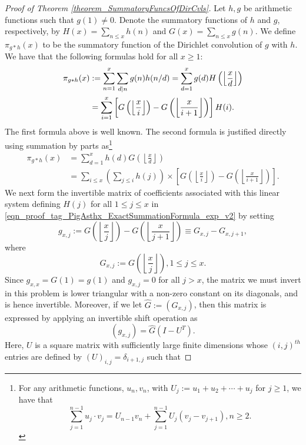 \documentclass[11pt,reqno,a4letter]{article}
\numberwithin{figure}{section}
\numberwithin{table}{section}
\newcommand{\floor}[1]{\left\lfloor #1 \right\rfloor}
\newcommand{\Floor}[2]{\ensuremath{\left\lfloor \frac{#1}{#2} \right\rfloor}}
\theoremstyle{plain}
\numberwithin{theorem}{section}
\theoremstyle{definition}
\begin{document}
\begin{proof}[Proof of Theorem \ref{theorem_SummatoryFuncsOfDirCvls}] 
\label{proofOf_theorem_SummatoryFuncsOfDirCvls} 
Let $h,g$ be arithmetic functions such that $g(1) \neq 0$. 
Denote the summatory functions of $h$ and $g$, 
respectively, by $H(x) = \sum_{n \leq x} h(n)$ and $G(x) = \sum_{n \leq x} g(n)$. 
We define $\pi_{g \ast h}(x)$ to be the summatory function of the 
Dirichlet convolution of $g$ with $h$. 
We have that the following formulas hold for all $x \geq 1$: 
\begin{align} 
\notag 
\pi_{g \ast h}(x) & := \sum_{n=1}^{x} \sum_{d|n} g(n) h(n/d) = \sum_{d=1}^x g(d) H\left(\floor{\frac{x}{d}}\right) \\ 
\label{eqn_proof_tag_PigAsthx_ExactSummationFormula_exp_v2} 
     & = \sum_{i=1}^x \left[G\left(\floor{\frac{x}{i}}\right) - G\left(\floor{\frac{x}{i+1}}\right)\right] H(i). 
\end{align} 
The first formula above is well known. The second formula is justified directly using 
summation by parts as\footnote{
     For any arithmetic functions, $u_n,v_n$, 
     with $U_j := u_1+u_2+\cdots+u_j$ for $j \geq 1$, we have that 
     \cite[\S 2.10(ii)]{NISTHB} 
     \[
     \sum_{j=1}^{n-1} u_j \cdot v_j = U_{n-1} v_n + 
          \sum_{j=1}^{n-1} U_j \left(v_j - v_{j+1}\right), n \geq 2. 
     \]
} 
\begin{align*} 
\pi_{g \ast h}(x) & = \sum_{d=1}^x h(d) G\left(\floor{\frac{x}{d}}\right) \\ 
     & = \sum_{i \leq x} \left(\sum_{j \leq i} h(j)\right) \times 
     \left[G\left(\floor{\frac{x}{i}}\right) - 
     G\left(\floor{\frac{x}{i+1}}\right)\right]. 
\end{align*} 
We next form the invertible matrix of coefficients associated with this linear system defining $H(j)$ for all 
$1 \leq j \leq x$ in \eqref{eqn_proof_tag_PigAsthx_ExactSummationFormula_exp_v2} by setting 
\[
g_{x,j} := G\left(\floor{\frac{x}{j}}\right) - G\left(\floor{\frac{x}{j+1}}\right) \equiv G_{x,j} - G_{x,j+1}, 
\] 
where 
\[
G_{x,j} := G\left(\Floor{x}{j}\right), 1 \leq j \leq x. 
\]
Since $g_{x,x} = G(1) = g(1)$ and $g_{x,j} = 0$ for all $j > x$, 
the matrix we must invert in this problem is lower triangular with a non-zero 
constant on its diagonals, and is hence invertible. 
Moreover, if we let $\hat{G} := (G_{x,j})$, then this matrix is 
expressed by applying an invertible shift operation as 
\[
(g_{x,j}) = \hat{G} (I - U^{T}). 
\]
Here, $U$ is a square matrix with sufficiently large finite dimensions 
whose $(i,j)^{th}$ entries are defined by $(U)_{i,j} = \delta_{i+1,j}$ such that 

\end{proof}
\end{document}
